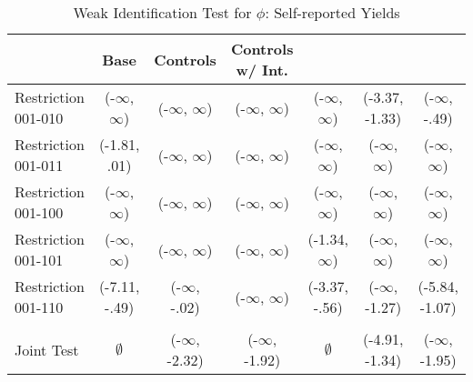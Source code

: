 \begin{table}
\caption{Weak Identification Test for $\phi$: Self-reported Yields \label{tbl:self}}
\begin{tabular}{l*{6}{c}}}
\toprule
{} &           Base &      Controls & Controls w/ Int. \\
\midrule
Restriction 001-010 &      (-$\infty$, $\infty$) &     (-$\infty$, $\infty$) &        (-$\infty$, $\infty$)	&      (-$\infty$, $\infty$) &  (-3.37, -1.33) &      (-$\infty$, -.49)  	\\
Restriction 001-011 &   (-1.81, .01) &     (-$\infty$, $\infty$) &        (-$\infty$, $\infty$) 			&      (-$\infty$, $\infty$) &       (-$\infty$, $\infty$) &        (-$\infty$, $\infty$) \\
Restriction 001-100 &      (-$\infty$, $\infty$) &     (-$\infty$, $\infty$) &        (-$\infty$, $\infty$)	&      (-$\infty$, $\infty$) &       (-$\infty$, $\infty$) &        (-$\infty$, $\infty$) \\
Restriction 001-101 &      (-$\infty$, $\infty$) &     (-$\infty$, $\infty$) &        (-$\infty$, $\infty$)	&    (-1.34, $\infty$) &       (-$\infty$, $\infty$) &        (-$\infty$, $\infty$) \\
Restriction 001-110 &  (-7.11, -.49) &   (-$\infty$, -.02) &        (-$\infty$, $\infty$) 					&  (-3.37, -.56) &    (-$\infty$, -1.27) &   (-5.84, -1.07) \\
\hline\\Joint Test  &         $\emptyset$ &  (-$\infty$, -2.32) &     (-$\infty$, -1.92) 					&         $\emptyset$ &  (-4.91, -1.34) &     (-$\infty$, -1.95) \\
\bottomrule
\end{tabular}
\end{table}